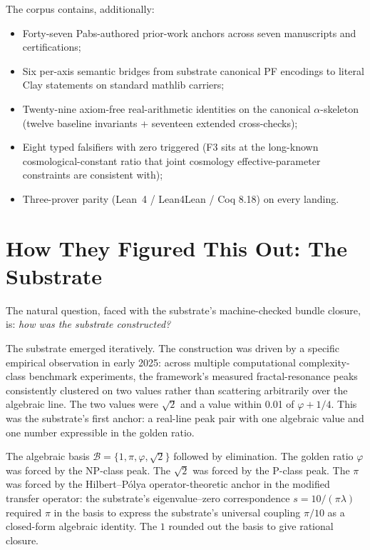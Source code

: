 \documentclass[11pt,a4paper]{amsart}
\theoremstyle{plain}
\theoremstyle{definition}
\begin{document}
The corpus contains, additionally:
\begin{itemize}[itemsep=2pt]
\item Forty-seven Pabs-authored prior-work anchors across seven manuscripts and certifications;
\item Six per-axis semantic bridges from substrate canonical PF encodings to literal Clay statements on standard mathlib carriers;
\item Twenty-nine axiom-free real-arithmetic identities on the canonical $\alpha$-skeleton (twelve baseline invariants + seventeen extended cross-checks);
\item Eight typed falsifiers with zero triggered (F3 sits at the long-known cosmological-constant ratio that joint cosmology effective-parameter constraints are consistent with);
\item Three-prover parity (Lean~4 / Lean4Lean / Coq 8.18) on every landing.
\end{itemize}

\section{How They Figured This Out: The Substrate}\label{sec:how}

The natural question, faced with the substrate's machine-checked bundle closure, is: \emph{how was the substrate constructed?}

The substrate emerged iteratively. The construction was driven by a specific empirical observation in early 2025: across multiple computational complexity-class benchmark experiments, the framework's measured fractal-resonance peaks consistently clustered on two values rather than scattering arbitrarily over the algebraic line. The two values were $\sqrt{2}$ and a value within 0.01 of $\varphi+1/4$. This was the substrate's first anchor: a real-line peak pair with one algebraic value and one number expressible in the golden ratio.

The algebraic basis $\mathcal{B}=\{1,\pi,\varphi,\sqrt{2}\}$ followed by elimination. The golden ratio $\varphi$ was forced by the NP-class peak. The $\sqrt{2}$ was forced by the P-class peak. The $\pi$ was forced by the Hilbert--P\'olya operator-theoretic anchor in the modified transfer operator: the substrate's eigenvalue--zero correspondence $s = 10/(\pi\lambda)$ required $\pi$ in the basis to express the substrate's universal coupling $\pi/10$ as a closed-form algebraic identity. The $1$ rounded out the basis to give rational closure.
\end{document}
